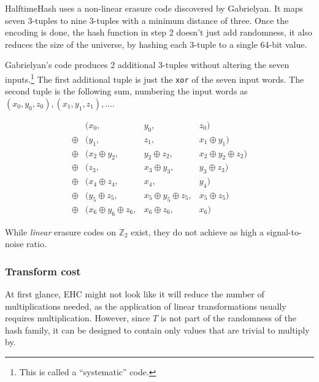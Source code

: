 \documentclass[sigconf, nonacm]{acmart}
\newcommand{\ints}{\mathbb{Z}}
\begin{document}

HalftimeHash uses a non-linear erasure code discovered by Gab\-ri\-el\-yan. \cite{9-7-erasure-code}
It maps seven 3-tuples to nine 3-tuples with a minimum distance of three.
Once the encoding is done, the hash function in step 2 doesn't just add randomness, it also reduces the size of the universe, by hashing each 3-tuple to a single 64-bit value.

Gabrielyan's code produces 2 additional 3-tuples without altering the seven inputs.\footnote{This is called a ``systematic'' code.}
The first additional tuple is just the \texttt{xor} of the seven input words.
The second tuple is the following sum, numbering the input words as $(x_0, y_0, z_0), (x_1, y_1, z_1), \dots$.

\begin{displaymath}
  \begin{array}{rlcr}
       & (x_0, & y_0, & z_0)\\
\oplus & (y_1,  & z_1,  & x_1 \oplus{} y_1) \\
\oplus & (x_2 \oplus{} y_2,& y_2 \oplus{} z_2,& x_2 \oplus{} y_2 \oplus{} z_2)\\
\oplus & (z_3,    &x_3 \oplus{} y_3,& y_3 \oplus{} z_3) \\
\oplus & (x_4 \oplus{} z_4,& x_4,& y_4)\\
\oplus & (y_5 \oplus{} z_5,& x_5 \oplus{} y_5 \oplus{} z_5,& x_5\oplus{}z_5)\\
\oplus & (x_6 \oplus{} y_6 \oplus{} z_6,& x_6 \oplus{} z_6,& x_6)
  \end{array}
\end{displaymath}

While {\em linear} erasure codes on $\ints_2$ exist, they do not achieve as high a signal-to-noise ratio. \cite{codetables.de}

\subsubsection{Transform cost}

At first glance, EHC might not look like it will reduce the number of multiplications needed, as the application of linear transformations usually requires multiplication.
However, since $T$ is not part of the randomness of the hash family, it can be designed to contain only values that are trivial to multiply by.
\end{document}
